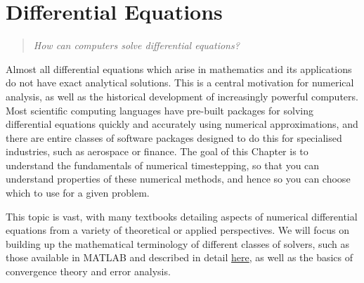 \documentclass[
  letterpaper,
  DIV=11,
  numbers=noendperiod]{scrreprt}
\begin{document}

\chapter{Differential Equations}\label{differential-equations}

\begin{quote}
\emph{How can computers solve differential equations?}
\end{quote}

Almost all differential equations which arise in mathematics and its
applications do not have exact analytical solutions. This is a central
motivation for numerical analysis, as well as the historical development
of increasingly powerful computers. Most scientific computing languages
have pre-built packages for solving differential equations quickly and
accurately using numerical approximations, and there are entire classes
of software packages designed to do this for specialised industries,
such as aerospace or finance. The goal of this Chapter is to understand
the fundamentals of numerical timestepping, so that you can understand
properties of these numerical methods, and hence so you can choose which
to use for a given problem.

\begin{tcolorbox}[enhanced jigsaw, opacityback=0, breakable, title=\textcolor{quarto-callout-note-color}{\faInfo}\hspace{0.5em}{Note}, arc=.35mm, coltitle=black, opacitybacktitle=0.6, bottomrule=.15mm, leftrule=.75mm, left=2mm, colbacktitle=quarto-callout-note-color!10!white, titlerule=0mm, toptitle=1mm, bottomtitle=1mm, colframe=quarto-callout-note-color-frame, rightrule=.15mm, colback=white, toprule=.15mm]

This topic is vast, with many textbooks detailing aspects of numerical
differential equations from a variety of theoretical or applied
perspectives. We will focus on building up the mathematical terminology
of different classes of solvers, such as those available in MATLAB and
described in detail
\href{https://uk.mathworks.com/help/matlab/ordinary-differential-equations.html}{here},
as well as the basics of convergence theory and error analysis.

\end{tcolorbox}
\end{document}
